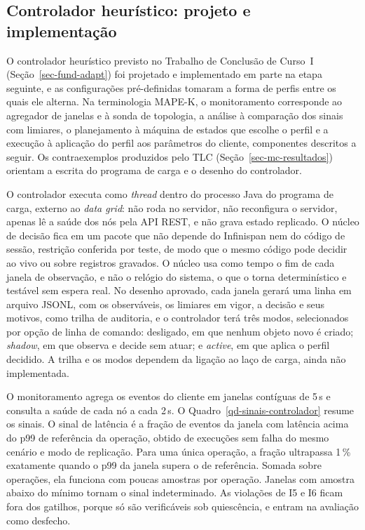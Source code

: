 \subsection*{Controlador heurístico: projeto e implementação}
\label{sec-controlador}

O controlador heurístico previsto no Trabalho de Conclusão de Curso~I (Seção~\ref{sec-fund-adapt}) foi projetado e implementado em parte na etapa seguinte, e as configurações pré-definidas tomaram a forma de perfis entre os quais ele alterna. Na terminologia MAPE-K, o monitoramento corresponde ao agregador de janelas e à sonda de topologia, a análise à comparação dos sinais com limiares, o planejamento à máquina de estados que escolhe o perfil e a execução à aplicação do perfil aos parâmetros do cliente, componentes descritos a seguir. Os contraexemplos produzidos pelo TLC (Seção~\ref{sec-mc-resultados}) orientam a escrita do programa de carga e o desenho do controlador.

O controlador executa como \emph{thread} dentro do processo Java do programa de carga, externo ao \emph{data grid}: não roda no servidor, não reconfigura o servidor, apenas lê a saúde dos nós pela API REST, e não grava estado replicado. O núcleo de decisão fica em um pacote que não depende do Infinispan nem do código de sessão, restrição conferida por teste, de modo que o mesmo código pode decidir ao vivo ou sobre registros gravados. O núcleo usa como tempo o fim de cada janela de observação, e não o relógio do sistema, o que o torna determinístico e testável sem espera real. No desenho aprovado, cada janela gerará uma linha em arquivo JSONL, com os observáveis, os limiares em vigor, a decisão e seus motivos, como trilha de auditoria, e o controlador terá três modos, selecionados por opção de linha de comando: desligado, em que nenhum objeto novo é criado; \emph{shadow}, em que observa e decide sem atuar; e \emph{active}, em que aplica o perfil decidido. A trilha e os modos dependem da ligação ao laço de carga, ainda não implementada.

O monitoramento agrega os eventos do cliente em janelas contíguas de 5\,s e consulta a saúde de cada nó a cada 2\,s. O Quadro~\ref{qd-sinais-controlador} resume os sinais. O sinal de latência é a fração de eventos da janela com latência acima do p99 de referência da operação, obtido de execuções sem falha do mesmo cenário e modo de replicação. Para uma única operação, a fração ultrapassa 1\,\% exatamente quando o p99 da janela supera o de referência. Somada sobre operações, ela funciona com poucas amostras por operação. Janelas com amostra abaixo do mínimo tornam o sinal indeterminado. As violações de I5 e I6 ficam fora dos gatilhos, porque só são verificáveis sob quiescência, e entram na avaliação como desfecho.

